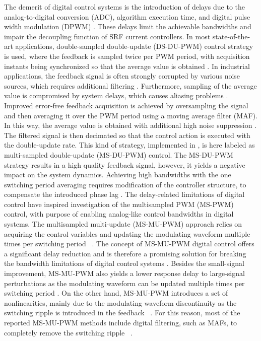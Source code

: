 \documentclass[conference]{IEEEtran}
\begin{document}
The demerit of digital control systems is the introduction of delays due to the analog-to-digital conversion (ADC), algorithm execution time, and digital pulse width modulation (DPWM) \cite{Buso2015}. These delays limit the achievable bandwidths and impair the decoupling function of SRF current controllers. 
In most state-of-the-art applications, double-sampled double-update (DS-DU-PWM) control strategy is used, where the feedback is sampled twice per PWM period, with acquisition instants being synchronized so that the average value is obtained \cite{Buso2015}. In industrial applications, the feedback signal is often strongly corrupted by various noise sources, which requires additional filtering \cite{vuksa2016}. Furthermore, sampling of the average value is compromised by system delays, which causes aliasing problems \cite{Buso2015}.
Improved error-free feedback acquisition is achieved by oversampling the signal and then averaging it over the PWM period using a moving average filter (MAF). In this way, the average value is obtained with additional high noise suppression \cite{vuksa2016,Petric2020}. The filtered signal is then decimated so that the control action is executed with the double-update rate. This kind of strategy, implemented in \cite{vuksa2016}, is here labeled as multi-sampled double-update (MS-DU-PWM) control. The MS-DU-PWM strategy results in a high quality feedback signal, however, it yields a negative impact on the system dynamics. Achieving high bandwidths with the one switching period averaging requires modification of the controller structure, to compensate the introduced phase lag \cite{vuksa2016}.
The delay-related limitations of digital control have inspired investigation of the multisampled PWM (MS-PWM) control, with purpose of enabling analog-like control bandwidths in digital systems. The multisampled multi-update (MS-MU-PWM) approach relies on acquiring the control variables and updating the modulating waveform multiple times per switching period ~\cite{corradini2018,corradini_analysis,rovere2018,Restrepo2019,Petric2020,Petric2021,Ito2021,He2021}. The concept of MS-MU-PWM digital control offers a significant delay reduction and is therefore a promising solution for breaking the bandwidth limitations of digital control systems \cite{corradini2018}. Besides the small-signal improvement, MS-MU-PWM also yields a lower response delay to large-signal perturbations as the modulating waveform can be updated multiple times per switching period \cite{Buso2016}. On the other hand, MS-MU-PWM introduces a set of nonlinearities, mainly due to the modulating waveform discontinuity as the switching ripple is introduced in the feedback ~\cite{corradini2018,Petric2021}. For this reason, most of the reported MS-MU-PWM methods include digital filtering, such as MAFs, to completely remove the switching ripple ~\cite{Restrepo2019,He2021}.
\end{document}
